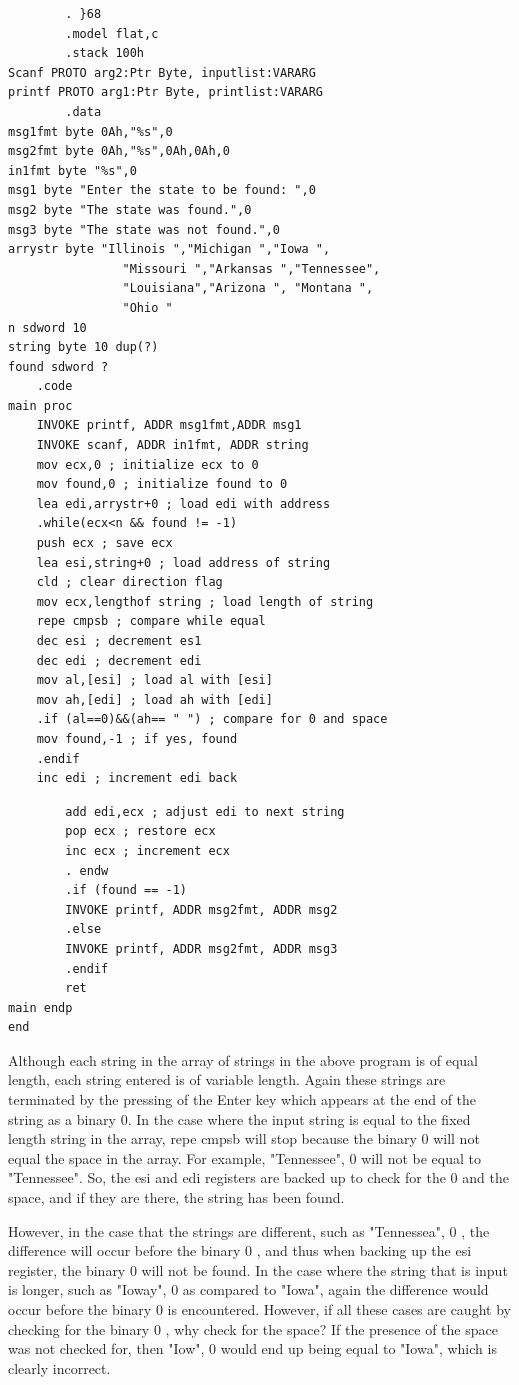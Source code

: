 \documentclass[10pt]{book}
\begin{document}
\begin{verbatim}
        . }68
        .model flat,c
        .stack 100h
Scanf PROTO arg2:Ptr Byte, inputlist:VARARG
printf PROTO arg1:Ptr Byte, printlist:VARARG
        .data
msg1fmt byte 0Ah,"%s",0
msg2fmt byte 0Ah,"%s",0Ah,0Ah,0
in1fmt byte "%s",0
msg1 byte "Enter the state to be found: ",0
msg2 byte "The state was found.",0
msg3 byte "The state was not found.",0
arrystr byte "Illinois ","Michigan ","Iowa ",
                "Missouri ","Arkansas ","Tennessee",
                "Louisiana","Arizona ", "Montana ",
                "Ohio "
n sdword 10
string byte 10 dup(?)
found sdword ?
    .code
main proc
    INVOKE printf, ADDR msg1fmt,ADDR msg1
    INVOKE scanf, ADDR in1fmt, ADDR string
    mov ecx,0 ; initialize ecx to 0
    mov found,0 ; initialize found to 0
    lea edi,arrystr+0 ; load edi with address
    .while(ecx<n && found != -1)
    push ecx ; save ecx
    lea esi,string+0 ; load address of string
    cld ; clear direction flag
    mov ecx,lengthof string ; load length of string
    repe cmpsb ; compare while equal
    dec esi ; decrement es1
    dec edi ; decrement edi
    mov al,[esi] ; load al with [esi]
    mov ah,[edi] ; load ah with [edi]
    .if (al==0)&&(ah== " ") ; compare for 0 and space
    mov found,-1 ; if yes, found
    .endif
    inc edi ; increment edi back
\end{verbatim}

\begin{verbatim}
        add edi,ecx ; adjust edi to next string
        pop ecx ; restore ecx
        inc ecx ; increment ecx
        . endw
        .if (found == -1)
        INVOKE printf, ADDR msg2fmt, ADDR msg2
        .else
        INVOKE printf, ADDR msg2fmt, ADDR msg3
        .endif
        ret
main endp
end
\end{verbatim}

Although each string in the array of strings in the above program is of equal length, each string entered is of variable length. Again these strings are terminated by the pressing of the Enter key which appears at the end of the string as a binary 0. In the case where the input string is equal to the fixed length string in the array, repe cmpsb will stop because the binary 0 will not equal the space in the array. For example, "Tennessee", 0 will not be equal to "Tennessee". So, the esi and edi registers are backed up to check for the 0 and the space, and if they are there, the string has been found.


However, in the case that the strings are different, such as "Tennessea", 0 , the difference will occur before the binary 0 , and thus when backing up the esi register, the binary 0 will not be found. In the case where the string that is input is longer, such as "Ioway", 0 as compared to "Iowa", again the difference would occur before the binary 0 is encountered. However, if all these cases are caught by checking for the binary 0 , why check for the space? If the presence of the space was not checked for, then "Iow", 0 would end up being equal to "Iowa", which is clearly incorrect.
\end{document}
